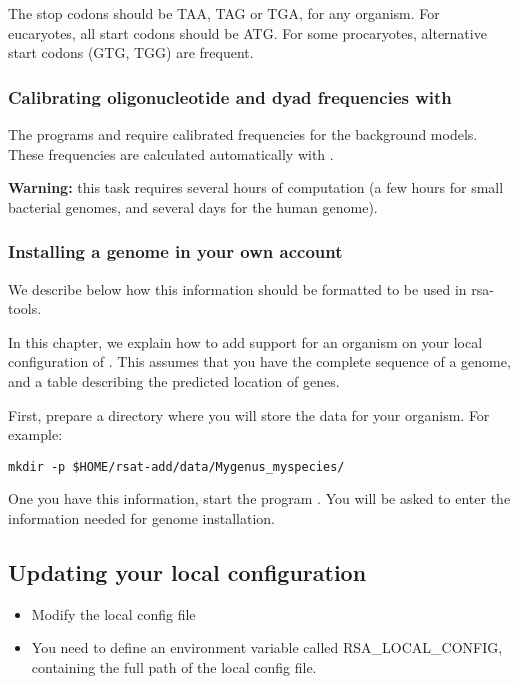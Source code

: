 The stop codons should be TAA, TAG or TGA, for any organism. For
eucaryotes, all start codons should be ATG. For some procaryotes,
alternative start codons (GTG, TGG) are frequent.

\subsubsection{Calibrating oligonucleotide and dyad frequencies with }

The programs  and 
  require calibrated frequencies for the background models. These
  frequencies are calculated automatically with
  .

\textbf{Warning: } this task requires several hours of computation (a
few hours for small bacterial genomes, and several days for the human
genome).

\subsubsection{Installing a genome in your own account}

We describe below how this information should be formatted to be used
in rsa-tools.

In this chapter, we explain how to add support for an organism on your
local configuration of \RSAT. This assumes that you have the complete
sequence of a genome, and a table describing the predicted location of
genes.

First, prepare a directory where you will store the data for your
organism. For example:

\begin{verbatim}
mkdir -p $HOME/rsat-add/data/Mygenus_myspecies/
\end{verbatim}


One you have this information, start the program
. You will be asked to enter the information
needed for genome installation.

\subsection{Updating your local configuration}


\begin{itemize}
\item Modify the local config file

\item You need to define an environment variable called
  RSA\_LOCAL\_CONFIG, containing the full path of the local config
  file.

\end{itemize}

